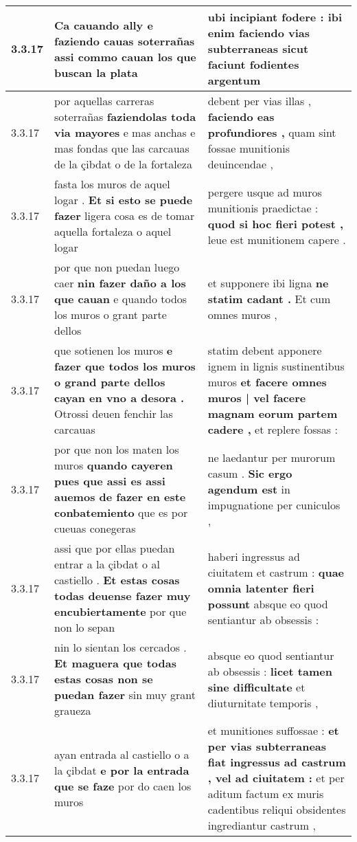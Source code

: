 \begin{tabular}{|p{1cm}|p{6.5cm}|p{6.5cm}|}
3.3.17 & Ca cauando ally \textbf{ e faziendo cauas soterrañas } assi commo cauan los que buscan la plata & ubi incipiant fodere : \textbf{ ibi enim faciendo vias subterraneas } sicut faciunt fodientes argentum \\\hline
3.3.17 & por aquellas carreras soterrañas \textbf{ faziendolas toda via mayores } e mas anchas e mas fondas que las carcauas de la çibdat o de la fortaleza & debent per vias illas , \textbf{ faciendo eas profundiores , } quam sint fossae munitionis deuincendae , \\\hline
3.3.17 & fasta los muros de aquel logar . \textbf{ Et si esto se puede fazer } ligera cosa es de tomar aquella fortaleza o aquel logar & pergere usque ad muros munitionis praedictae : \textbf{ quod si hoc fieri potest , } leue est munitionem capere . \\\hline
3.3.17 & por que non puedan luego caer \textbf{ nin fazer daño a los que cauan } e quando todos los muros o grant parte dellos & et supponere ibi ligna \textbf{ ne statim cadant . } Et cum omnes muros , \\\hline
3.3.17 & que sotienen los muros \textbf{ e fazer que todos los muros o grand parte dellos cayan en vno a desora . } Otrossi deuen fenchir las carcauas & statim debent apponere ignem in lignis sustinentibus muros \textbf{ et facere omnes muros | vel facere magnam eorum partem cadere , } et replere fossas : \\\hline
3.3.17 & por que non los maten los muros \textbf{ quando cayeren pues que assi es assi auemos de fazer en este conbatemiento } que es por cueuas conegeras & ne laedantur per murorum casum . \textbf{ Sic ergo agendum est } in impugnatione per cuniculos , \\\hline
3.3.17 & assi que por ellas puedan entrar a la çibdat o al castiello . \textbf{ Et estas cosas todas deuense fazer muy encubiertamente } por que non lo sepan & haberi ingressus ad ciuitatem et castrum : \textbf{ quae omnia latenter fieri possunt } absque eo quod sentiantur ab obsessis : \\\hline
3.3.17 & nin lo sientan los cercados . \textbf{ Et maguera que todas estas cosas non se puedan fazer } sin muy grant graueza & absque eo quod sentiantur ab obsessis : \textbf{ licet tamen sine difficultate } et diuturnitate temporis , \\\hline
3.3.17 & ayan entrada al castiello o a la çibdat \textbf{ e por la entrada que se faze } por do caen los muros & et munitiones suffossae : \textbf{ et per vias subterraneas fiat ingressus ad castrum , vel ad ciuitatem : } et per aditum factum ex muris cadentibus reliqui obsidentes ingrediantur castrum , \\\hline

\end{tabular}
